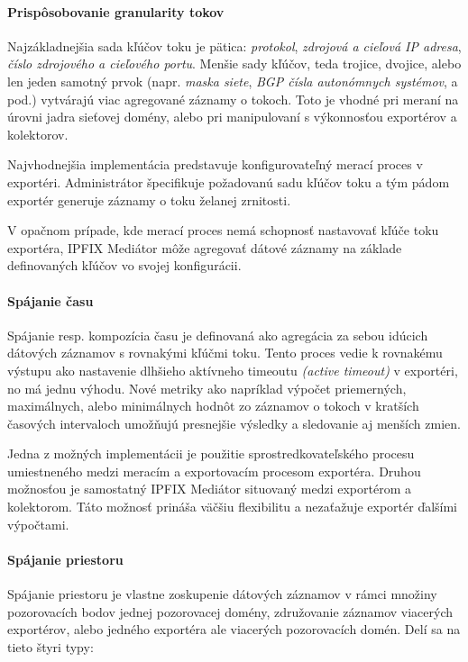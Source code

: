 \paragraph{Prispôsobovanie granularity tokov}

Najzákladnejšia sada kľúčov toku je pätica: \emph{protokol}, \emph{zdrojová a cieľová IP adresa}, 
\emph{číslo zdrojového a cieľového portu}. Menšie sady kľúčov, teda trojice, dvojice, alebo len jeden 
samotný prvok (napr. \emph{maska siete}, \emph{BGP čísla autonómnych systémov}, a pod.) vytvárajú viac 
agregované záznamy o tokoch. Toto je vhodné pri meraní na úrovni 
jadra sieťovej domény, alebo pri manipulovaní s výkonnosťou exportérov a kolektorov.

Najvhodnejšia implementácia predstavuje konfigurovateľný merací proces v exportéri. Administrátor 
špecifikuje požadovanú sadu kľúčov toku a tým pádom exportér generuje záznamy o toku želanej zrnitosti.

V opačnom prípade, kde merací proces nemá schopnosť nastavovať kľúče toku exportéra, IPFIX Mediátor 
môže agregovať dátové záznamy na základe definovaných kľúčov vo svojej konfigurácii.


\paragraph{Spájanie času}

Spájanie resp. kompozícia času je definovaná ako agregácia za sebou idúcich dátových záznamov s rovnakými
kľúčmi toku. Tento proces vedie k rovnakému výstupu ako nastavenie dlhšieho aktívneho timeoutu
\emph{(active timeout)} v exportéri, no má jednu výhodu. Nové metriky ako napríklad výpočet priemerných, 
maximálnych, alebo minimálnych hodnôt zo záznamov o tokoch v kratších časových intervaloch umožňujú 
presnejšie výsledky a sledovanie aj menších zmien.

Jedna z možných implementácii je použitie sprostredkovateľského procesu umiestneného medzi 
meracím a exportovacím procesom exportéra. Druhou možnosťou je samostatný IPFIX Mediátor situovaný medzi
exportérom a kolektorom. Táto možnosť prináša väčšiu flexibilitu a nezaťažuje exportér ďalšími výpočtami.


\paragraph{Spájanie priestoru} \label{sec:spatial}

Spájanie priestoru je vlastne zoskupenie dátových záznamov v rámci množiny pozorovacích bodov jednej 
pozorovacej domény, združovanie záznamov viacerých exportérov, alebo jedného exportéra ale viacerých 
pozorovacích domén. Delí sa na tieto štyri typy:

